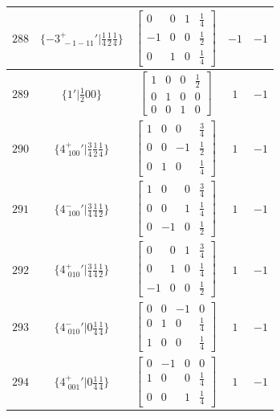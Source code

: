 \documentclass[fleqn,8pt]{jsarticle}
\begin{document}
\begin{longtable}{ccccc}
$ 288 $ & $ \{-3^{+}_{\,\,-1-11}{}'|\frac{1}{4} \frac{1}{2} \frac{1}{4}\} $ & $ \begin{bmatrix} 0 & 0 & 1 & \frac{1}{4} \\ -1 & 0 & 0 & \frac{1}{2} \\ 0 & 1 & 0 & \frac{1}{4} \end{bmatrix} $ & $ -1 $ & $ -1 $ \\ \hline
$ 289 $ & $ \{1{}'|\frac{1}{2} 0 0\} $ & $ \begin{bmatrix} 1 & 0 & 0 & \frac{1}{2} \\ 0 & 1 & 0 & 0 \\ 0 & 0 & 1 & 0 \end{bmatrix} $ & $ 1 $ & $ -1 $ \\ \hline
$ 290 $ & $ \{4^{+}_{\,\,100}{}'|\frac{3}{4} \frac{1}{2} \frac{1}{4}\} $ & $ \begin{bmatrix} 1 & 0 & 0 & \frac{3}{4} \\ 0 & 0 & -1 & \frac{1}{2} \\ 0 & 1 & 0 & \frac{1}{4} \end{bmatrix} $ & $ 1 $ & $ -1 $ \\ \hline
$ 291 $ & $ \{4^{-}_{\,\,100}{}'|\frac{3}{4} \frac{1}{4} \frac{1}{2}\} $ & $ \begin{bmatrix} 1 & 0 & 0 & \frac{3}{4} \\ 0 & 0 & 1 & \frac{1}{4} \\ 0 & -1 & 0 & \frac{1}{2} \end{bmatrix} $ & $ 1 $ & $ -1 $ \\ \hline
$ 292 $ & $ \{4^{+}_{\,\,010}{}'|\frac{3}{4} \frac{1}{4} \frac{1}{2}\} $ & $ \begin{bmatrix} 0 & 0 & 1 & \frac{3}{4} \\ 0 & 1 & 0 & \frac{1}{4} \\ -1 & 0 & 0 & \frac{1}{2} \end{bmatrix} $ & $ 1 $ & $ -1 $ \\ \hline
$ 293 $ & $ \{4^{-}_{\,\,010}{}'|0 \frac{1}{4} \frac{1}{4}\} $ & $ \begin{bmatrix} 0 & 0 & -1 & 0 \\ 0 & 1 & 0 & \frac{1}{4} \\ 1 & 0 & 0 & \frac{1}{4} \end{bmatrix} $ & $ 1 $ & $ -1 $ \\ \hline
$ 294 $ & $ \{4^{+}_{\,\,001}{}'|0 \frac{1}{4} \frac{1}{4}\} $ & $ \begin{bmatrix} 0 & -1 & 0 & 0 \\ 1 & 0 & 0 & \frac{1}{4} \\ 0 & 0 & 1 & \frac{1}{4} \end{bmatrix} $ & $ 1 $ & $ -1 $ \\ \hline

\end{longtable}
\end{document}

